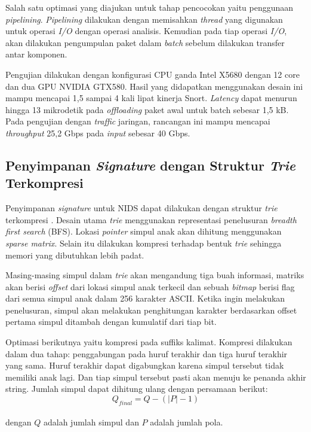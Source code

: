     Salah satu optimasi yang diajukan untuk tahap pencocokan yaitu penggunaan \emph{pipelining}. \emph{Pipelining} dilakukan dengan memisahkan \emph{thread} yang digunakan untuk operasi \emph{I/O} dengan operasi analisis. Kemudian pada tiap operasi \emph{I/O}, akan dilakukan pengumpulan paket dalam \emph{batch} sebelum dilakukan transfer antar komponen. 

    Pengujian dilakukan dengan konfigurasi CPU ganda Intel X5680 dengan 12 core dan dua GPU NVIDIA GTX580. Hasil yang didapatkan menggunakan desain ini mampu mencapai 1,5 sampai 4 kali lipat kinerja Snort. \emph{Latency} dapat menurun hingga 13 mikrodetik pada \emph{offloading} paket awal untuk batch sebesar 1,5 kB. Pada pengujian dengan \emph{traffic} jaringan, rancangan ini mampu mencapai \emph{throughput} 25,2 Gbps pada \emph{input} sebesar 40 Gbps.

  \subsection{Penyimpanan \emph{Signature} dengan Struktur \emph{Trie} Terkompresi}

    Penyimpanan \emph{signature} untuk NIDS dapat dilakukan dengan struktur \emph{trie} terkompresi \citep{bellekens2014}. Desain utama \emph{trie} menggunakan representasi penelusuran \emph{breadth first search} (BFS). Lokasi \emph{pointer} simpul anak akan dihitung menggunakan \emph{sparse matrix}. Selain itu dilakukan kompresi terhadap bentuk \emph{trie} sehingga memori yang dibutuhkan lebih padat.

    Masing-masing simpul dalam \emph{trie} akan mengandung tiga buah informasi, matriks akan berisi \emph{offset} dari lokasi simpul anak terkecil dan sebuah \emph{bitmap} berisi flag dari semua simpul anak dalam 256 karakter ASCII. Ketika ingin melakukan penelusuran, simpul akan melakukan penghitungan karakter berdasarkan offset pertama simpul ditambah dengan kumulatif dari tiap bit.

    Optimasi berikutnya yaitu kompresi pada suffiks kalimat. Kompresi dilakukan dalam dua tahap: penggabungan pada huruf terakhir dan tiga huruf terakhir yang sama. Huruf terakhir dapat digabungkan karena simpul tersebut tidak memiliki anak lagi. Dan tiap simpul tersebut pasti akan menuju ke penanda akhir string. Jumlah simpul dapat dihitung ulang dengan persamaan berikut: \\
    \begin{equation}
      Q_{final} = Q - \left(\left|P\right| - 1 \right)
    \end{equation} \\
    dengan $Q$ adalah jumlah simpul dan $P$ adalah jumlah pola.

